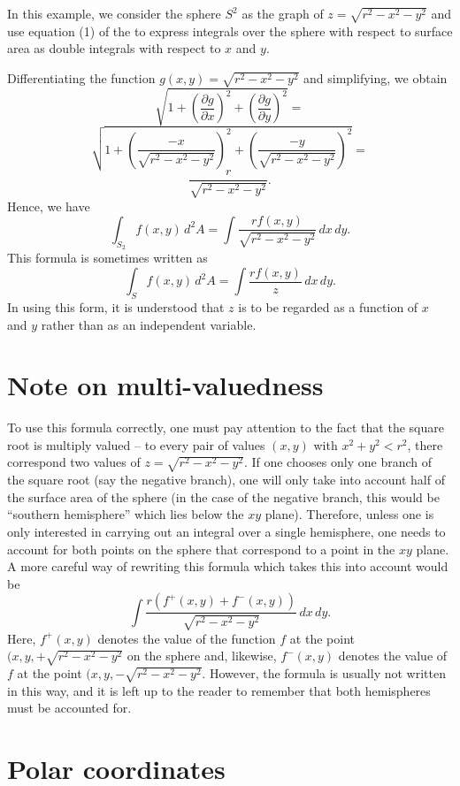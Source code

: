 \documentclass[12pt]{article}
\begin{document}
In this example, we consider the sphere $S^2$ as the graph of $z =  \sqrt{ r^2 - x^2 - y^2 }$ and use equation (1) of the  to express integrals over the sphere with respect to surface area as double integrals with respect to $x$ and $y$.

Differentiating the function $g(x,y) = \sqrt{ r^2 - x^2 - y^2 }$ and simplifying, we obtain
 $$\sqrt{1 + \left( \frac{\partial g}{\partial x} \right)^2 + \left( \frac{\partial g}{\partial y} \right)^2} =$$
 $$\sqrt{1 + \left( \frac{-x}{\sqrt{ r^2 - x^2 - y^2 }} \right)^2 + \left( \frac{-y}{\sqrt{ r^2 - x^2 - y^2 }} \right)^2} =$$
 $$\frac{r}{\sqrt{ r^2 - x^2 - y^2 }}.$$
Hence, we have
 $$\int_{S_2} f(x,y) \, d^2 A = \int \frac{r f(x,y)}{\sqrt{ r^2 - x^2 - y^2 }} \, dx \, dy.$$
This formula is sometimes written as
 $$\int_S f(x,y) \, d^2 A = \int \frac{r f(x,y)}{z} \, dx \, dy.$$
In using this form, it is understood that $z$ is to be regarded as a function of $x$ and $y$ rather than as an independent variable.

\section{Note on multi-valuedness}

To use this formula correctly, one must pay attention to the fact that the square root is multiply valued -- to every pair of values $(x,y)$ with $x^2 + y^2 < r^2$, there correspond two values of $z = \sqrt{ r^2 - x^2 - y^2 }$.  If one chooses only one branch of the square root (say the negative branch), one will only take into account half of the surface area of the sphere (in the case of the negative branch, this would be ``southern hemisphere'' which lies below the $xy$ plane).   Therefore, unless one is only interested in carrying out an integral over a single hemisphere, one needs to account for both points on the sphere that correspond to a point in the $xy$ plane.  A more careful way of rewriting this formula which takes this into account would be
 $$\int \frac{r (f^+ (x,y) + f^- (x,y))}{\sqrt{ r^2 - x^2 - y^2 }} \, dx \, dy.$$
Here, $f^+ (x,y)$ denotes the value of the function $f$ at the point $(x, y, +\sqrt{ r^2 - x^2 - y^2 }$ on the sphere and, likewise,  $f^- (x,y)$ denotes the value of $f$ at the point $(x, y, -\sqrt{ r^2 - x^2 - y^2 }$.  However, the formula is usually not written in this way, and it is left up to the reader to remember that both hemispheres must be accounted for.

\section{Polar coordinates}
\end{document}
